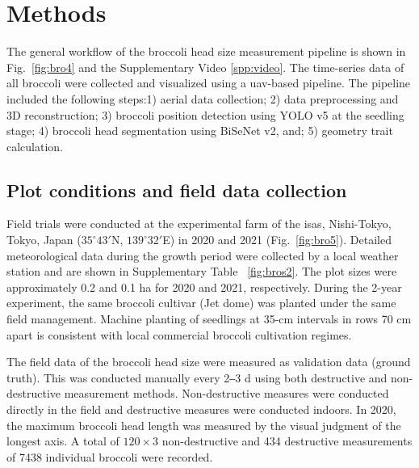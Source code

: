 \section{Methods}

The general workflow of the broccoli head size measurement pipeline is shown in Fig.~\ref{fig:bro4} and the Supplementary Video \ref{spp:video}. The time-series data of all broccoli were collected and visualized using a \gls{uav}-based pipeline. The pipeline included the following steps:1) aerial data collection; 2) data preprocessing and 3D reconstruction; 3) broccoli position detection using YOLO v5 at the seedling stage; 4) broccoli head segmentation using BiSeNet v2, and; 5) geometry trait calculation. 




\subsection{Plot conditions and field data collection}

Field trials were conducted at the experimental farm of the \gls{isas}, Nishi-Tokyo, Tokyo, Japan ($35^\circ 43'$N, $139^\circ 32'$E) in 2020 and 2021 (Fig.~\ref{fig:bro5}). Detailed meteorological data during the growth period were collected by a local weather station and are shown in Supplementary Table ~\ref{fig:bros2}. The plot sizes were approximately 0.2 and 0.1 ha for 2020 and 2021, respectively. During the 2-year experiment, the same broccoli cultivar (Jet dome) was planted under the same field management. Machine planting of seedlings at 35-cm intervals in rows 70 cm apart is consistent with local commercial broccoli cultivation regimes. 



The field data of the broccoli head size were measured as validation data (ground truth). This was conducted manually every 2‒3 d using both destructive and non-destructive measurement methods. Non-destructive measures were conducted directly in the field and destructive measures were conducted indoors. In 2020, the maximum broccoli head length was measured by the visual judgment of the longest axis. A total of $120 \times 3$ non-destructive and 434 destructive measurements of 7438 individual broccoli were recorded. 

